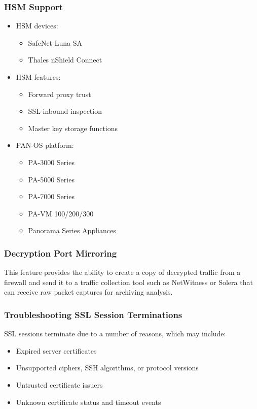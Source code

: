 \subsubsection{HSM Support}
\begin{itemize}
    \item HSM devices:
        \begin{itemize}
            \item SafeNet Luna SA
            \item Thales nShield Connect
        \end{itemize}
    \item HSM features:
        \begin{itemize}
            \item Forward proxy trust
            \item SSL inbound inspection
            \item Master key storage functions
        \end{itemize}
    \item PAN-OS platform:
        \begin{itemize}
            \item PA-3000 Series
            \item PA-5000 Series
            \item PA-7000 Series
            \item PA-VM 100/200/300
            \item Panorama Series Appliances
        \end{itemize}
\end{itemize}

\subsubsection{Decryption Port Mirroring}
This feature provides the ability to create a copy of decrypted traffic from a firewall and send it to a traffic collection tool such as NetWitness or Solera that can receive raw packet captures for archiving analysis.

\subsubsection{Troubleshooting SSL Session Terminations}
SSL sessions terminate due to a number of reasons, which may include:
\begin{itemize}
    \item Expired server certificates
    \item Unsupported ciphers, SSH algorithms, or protocol versions
    \item Untrusted certificate issuers
    \item Unknown certificate status and timeout events
\end{itemize}

